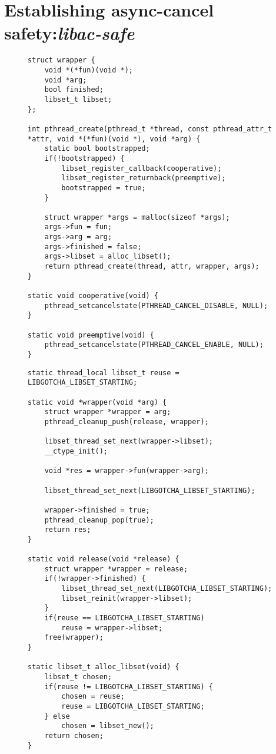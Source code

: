 

\section{Establishing async-cancel safety:\@ \textit{libac-safe}}

\begin{figure}
\begin{lstlisting}[label=lst:acsafe_gotchas,caption=\textit{libac-safe}'s \texttt{pthread\_create()} replacement and control library callbacks]
struct wrapper {
	void *(*fun)(void *);
	void *arg;
	bool finished;
	libset_t libset;
};

int pthread_create(pthread_t *thread, const pthread_attr_t *attr, void *(*fun)(void *), void *arg) {
	static bool bootstrapped;
	if(!bootstrapped) {
		libset_register_callback(cooperative);
		libset_register_returnback(preemptive);
		bootstrapped = true;
	}

	struct wrapper *args = malloc(sizeof *args);
	args->fun = fun;
	args->arg = arg;
	args->finished = false;
	args->libset = alloc_libset();
	return pthread_create(thread, attr, wrapper, args);
}

static void cooperative(void) {
	pthread_setcancelstate(PTHREAD_CANCEL_DISABLE, NULL);
}

static void preemptive(void) {
	pthread_setcancelstate(PTHREAD_CANCEL_ENABLE, NULL);
}
\end{lstlisting}
\end{figure}

\begin{figure}
\begin{lstlisting}[label=lst:acsafe_helpers,caption=\textit{libac-safe}'s thread initializer and cleanup handler]
static thread_local libset_t reuse = LIBGOTCHA_LIBSET_STARTING;

static void *wrapper(void *arg) {
	struct wrapper *wrapper = arg;
	pthread_cleanup_push(release, wrapper);

	libset_thread_set_next(wrapper->libset);
	__ctype_init();

	void *res = wrapper->fun(wrapper->arg);

	libset_thread_set_next(LIBGOTCHA_LIBSET_STARTING);

	wrapper->finished = true;
	pthread_cleanup_pop(true);
	return res;
}

static void release(void *release) {
	struct wrapper *wrapper = release;
	if(!wrapper->finished) {
		libset_thread_set_next(LIBGOTCHA_LIBSET_STARTING);
		libset_reinit(wrapper->libset);
	}
	if(reuse == LIBGOTCHA_LIBSET_STARTING)
		reuse = wrapper->libset;
	free(wrapper);
}

static libset_t alloc_libset(void) {
	libset_t chosen;
	if(reuse != LIBGOTCHA_LIBSET_STARTING) {
		chosen = reuse;
		reuse = LIBGOTCHA_LIBSET_STARTING;
	} else
		chosen = libset_new();
	return chosen;
}
\end{lstlisting}
\end{figure}
